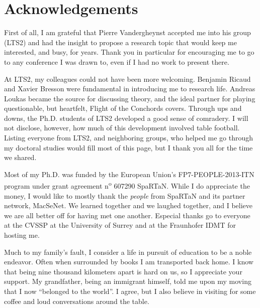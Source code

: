 \chapter*{Acknowledgements}

\vspace*{\fill}

First of all, I am grateful that Pierre Vandergheynst accepted me into his group (LTS2) and had the insight to propose a research topic that would keep me interested, and busy, for years. Thank you in particular for encouraging me to go to any conference I was drawn to, even if I had no work to present there.

\vspace*{\fill}

At LTS2, my colleagues could not have been more welcoming. Benjamin Ricaud and Xavier Bresson were fundamental in introducing me to research life. Andreas Loukas became the source for discussing theory, and the ideal partner for playing questionable, but heartfelt, Flight of the Conchords covers. Through ups and downs, the Ph.D. students of LTS2 developed a good sense of comradery. I will not disclose, however, how much of this development involved table football. Listing everyone from LTS2, and neighboring groups, who helped me go through my doctoral studies would fill most of this page, but I thank you all for the time we shared.

\vspace*{\fill}

Most of my Ph.D. was funded by the European Union's FP7-PEOPLE-2013-ITN program under grant agreement n\textsuperscript{o} 607290 SpaRTaN. While I do appreciate the money, I would like to mostly thank the \emph{people} from  SpaRTaN and its partner network, MacSeNet. We learned together and we laughed together, and I believe we are all better off for having met one another. Especial thanks go to everyone at the CVSSP at the University of Surrey and at the Fraunhofer IDMT for hosting me.

\vspace*{\fill}

Much to my family's fault, I consider a life in pursuit of education to be a noble endeavor. Often when surrounded by books I am transported back home. I know that being nine thousand kilometers apart is hard on us, so I appreciate your support. My grandfather, being an immigrant himself, told me upon my moving that I now ``belonged to the world''. I agree, but I also believe in visiting for some coffee and loud conversations around the table.

